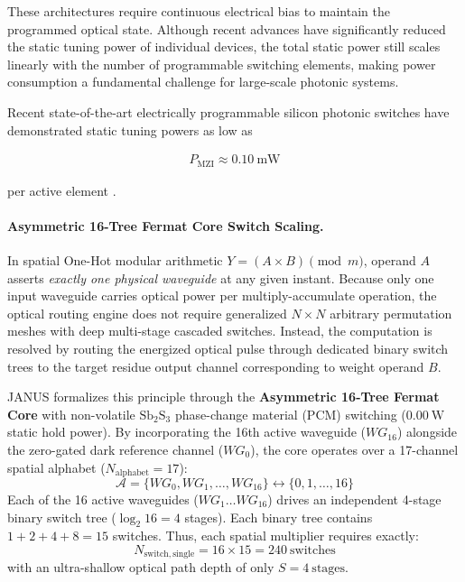\documentclass[journal]{IEEEtran}
\begin{document}
These architectures require continuous electrical bias to maintain the programmed optical state. Although recent advances have significantly reduced the static tuning power of individual devices, the total static power still scales linearly with the number of programmable switching elements, making power consumption a fundamental challenge for large-scale photonic systems.

Recent state-of-the-art electrically programmable silicon photonic switches have demonstrated static tuning powers as low as

\begin{align}
P_{\mathrm{MZI}}
\approx
0.10~\mathrm{mW}
\label{eq:mzi_static_power}
\end{align}

per active element \cite{Sinatkas2021}.

\paragraph{\textbf{Asymmetric 16-Tree Fermat Core Switch Scaling.}}
In spatial One-Hot modular arithmetic $Y = (A \times B) \pmod{m}$, operand $A$ asserts \textit{exactly one physical waveguide} at any given instant. Because only one input waveguide carries optical power per multiply-accumulate operation, the optical routing engine does not require generalized $N \times N$ arbitrary permutation meshes with deep multi-stage cascaded switches. Instead, the computation is resolved by routing the energized optical pulse through dedicated binary switch trees to the target residue output channel corresponding to weight operand $B$.

JANUS formalizes this principle through the \textbf{Asymmetric 16-Tree Fermat Core} with non-volatile $\mathrm{Sb_2S_3}$ phase-change material (PCM) switching ($0.00~\mathrm{W}$ static hold power). By incorporating the 16th active waveguide ($WG_{16}$) alongside the zero-gated dark reference channel ($WG_0$), the core operates over a 17-channel spatial alphabet ($N_{\mathrm{alphabet}} = 17$):
\begin{equation}
\mathcal{A} = \{ WG_0, WG_1, \dots, WG_{16} \} \longleftrightarrow \{ 0, 1, \dots, 16 \}
\end{equation}
Each of the 16 active waveguides ($WG_1 \dots WG_{16}$) drives an independent 4-stage binary switch tree ($\log_2 16 = 4$ stages). Each binary tree contains $1 + 2 + 4 + 8 = 15$ switches. Thus, each spatial multiplier requires exactly:
\begin{equation}
N_{\mathrm{switch,single}} = 16 \times 15 = 240~\mathrm{switches}
\label{eq:16tree_switches}
\end{equation}
with an ultra-shallow optical path depth of only $S = 4~\mathrm{stages}$.
\end{document}
